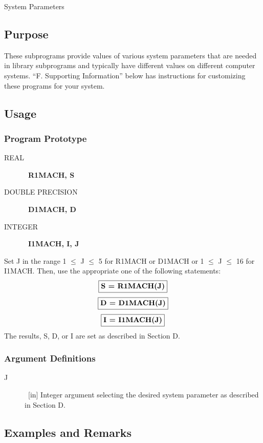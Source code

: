 \documentclass[twoside]{MATH77}
\begin{document}
 System Parameters


\subsection{Purpose}

These subprograms provide values of various system parameters that
are needed in library subprograms and typically have different values
on different computer systems.  ``F. Supporting Information'' below
has instructions for customizing these programs for your system.

\subsection{Usage}

\subsubsection{Program Prototype}

\begin{description}
\item[REAL]  \ {\bf R1MACH, S}

\item[DOUBLE PRECISION]  \ {\bf D1MACH, D}

\item[INTEGER]  \ {\bf I1MACH, I, J}
\end{description}

Set J in the range 1 $\leq $ J $\leq $ 5 for R1MACH or D1MACH or 1 $\leq $ J
$\leq $ 16 for I1MACH. Then, use the appropriate one of the following
statements:
$$
\fbox{{\bf S = R1MACH(J)}}
$$
$$
\fbox{{\bf D = D1MACH(J)}}
$$
$$
\fbox{{\bf I = I1MACH(J)}}
$$
The results, S, D, or I are set as described in Section D.

\subsubsection{Argument Definitions}

\begin{description}
\item[J]  \ [in] Integer argument selecting the desired system parameter as
described in Section D.
\end{description}

\subsection{Examples and Remarks}
\end{document}
